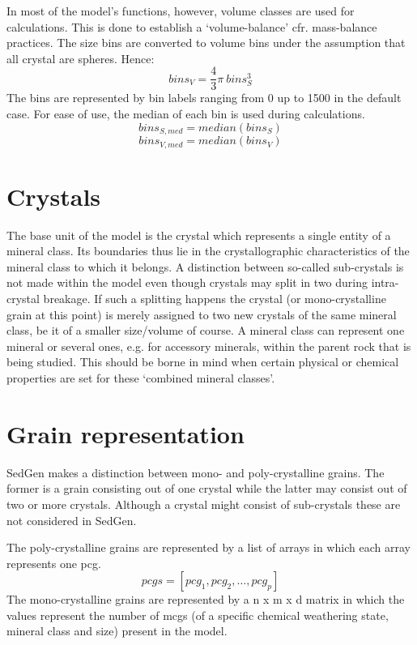 In most of the model's functions, however, volume classes are used for calculations. %
This is done to establish a `volume-balance' cfr. mass-balance practices. %
The size bins are converted to volume bins under the assumption that all crystal are spheres. %
Hence: %
    \begin{equation}
        bins_{V} = \frac{4}{3} \pi\ bins_{S}^{3}
    \end{equation}
The bins are represented by bin labels ranging from 0 up to 1500 in the default case. %
For ease of use, the median of each bin is used during calculations. %
    \begin{equation}
        bins_{S, med} = median(bins_{S})
    \end{equation}
    \begin{equation}
        bins_{V, med} = median(bins_{V})
    \end{equation}


\section{Crystals}
The base unit of the model is the crystal which represents a single entity of a mineral class. %
Its boundaries thus lie in the crystallographic characteristics of the mineral class to which it belongs. %
A distinction between so-called sub-crystals is not made within the model even though crystals may split in two during intra-crystal breakage. %
If such a splitting happens the crystal (or mono-crystalline grain at this point) is merely assigned to two new crystals of the same mineral class, be it of a smaller size/volume of course. %
A mineral class can represent one mineral or several ones, e.g. for accessory minerals, within the parent rock that is being studied. %
This should be borne in mind when certain physical or chemical properties are set for these `combined mineral classes'. %



\section{Grain representation}
SedGen makes a distinction between mono- and poly-crystalline grains. %
The former is a grain consisting out of one crystal while the latter may consist out of two or more crystals. %
Although a crystal might consist of sub-crystals these are not considered in SedGen. %

The poly-crystalline grains are represented by a list of arrays in which each array represents one pcg.
\begin{equation}
    pcgs = [pcg_1, pcg_2, \ldots, pcg_p]
\end{equation}
The mono-crystalline grains are represented by a n x m x d matrix in which the values represent the number of mcgs (of a specific chemical weathering state, mineral class and size) present in the model. %

